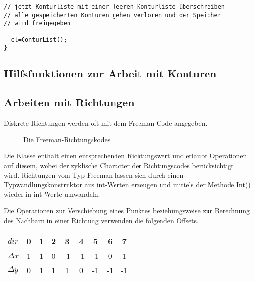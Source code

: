 {\begin{verbatim}
// jetzt Konturliste mit einer leeren Konturliste überschreiben
// alle gespeicherten Konturen gehen verloren und der Speicher
// wird freigegeben

  cl=ConturList();
}
\end{verbatim}
\endprogr

\subsection{Hilfsfunktionen zur Arbeit mit Konturen}


\subsection{Arbeiten mit Richtungen}
\hypertarget{Freeman}{}

Diskrete Richtungen werden oft mit dem Freeman-Code angegeben. 

\begin{figure}
  \label{fig:freeman}
  \caption{Die Freeman-Richtungskodes}
\end{figure}

Die Klasse  enthält einen entsprechenden Richtungswert und erlaubt Operationen auf diesem,
wobei der zyklische Character der Richtungscodes berücksichtigt wird. Richtungen vom Typ Freeman 
lassen sich durch einen Typwandlungskonstruktor aus int-Werten erzeugen und mittels der Methode 
Int() wieder in int-Werte umwandeln.

Die Operationen zur Verschiebung eines Punktes beziehungsweise zur Berechnung des Nachbarn in
einer Richtung verwenden die folgenden Offsets.

\begin{tabular}{|l|c|c|c|c|c|c|c|c|} \hline
$dir$     & 0 & 1 & 2 & 3 & 4 & 5 & 6 & 7 \\ \hline
$\Delta x$ & 1 & 1 & 0 & -1 & -1 & -1 & 0 & 1 \\ \hline
$\Delta y$ & 0 & 1 & 1 & 1 & 0 & -1 & -1 & -1 \\ \hline
\end{tabular}

}
